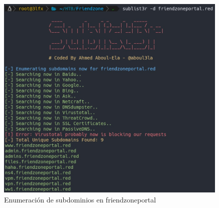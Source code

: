         \begin{figure}[H]
            \centering
            \includegraphics[width=0.99\textwidth]{informe4/imagenes/friendzone/11_sublister1.png}
            \caption{Enumeración de subdominios en friendzoneportal} 
        \end{figure}

